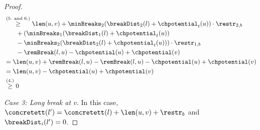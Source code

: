 \begin{proof}
\begin{align}
\begin{split}
			&\stackrel{\text{(5. and 6.)}}{\ge} \len(u,v)  + \minBreaks_2(\breakDist_2(l) + \chpotential_t(u)) \cdot \restr_{2,b}\\
			& \phantom{{}=1} + (\minBreaks_1(\breakDist_1(l) + \chpotential_t(u))\\
			& \phantom{{}=1} - \minBreaks_2(\breakDist_2(l) + \chpotential_t(u))) \cdot \restr_{1,b}\\
			& \phantom{{}=1} - \remBreak(l,u) - \chpotential(u) + \chpotential(v)\\
			&= \len(u,v) +  \remBreak(l,u) - \remBreak(l,u) - \chpotential(u) + \chpotential(v)\\
			&= \len(u,v) - \chpotential(u) + \chpotential(v)\\
			&\stackrel{\text{(4.)}}{\ge} 0
		\end{split}
	\end{align}


	\emph{Case 3: Long break at $v$}. In this case, $\concretett(l') = \concretett(l) + \len(u,v) + \restr_b$ and $\breakDist_i(l') = 0$.


\end{proof}
